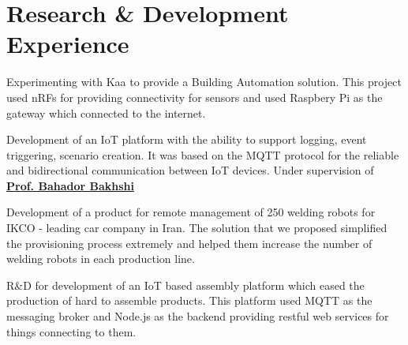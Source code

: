 \documentclass[]{deedy-resume-openfont}
\begin{document}
\begin{minipage}[t]{0.66\textwidth}


\section{Research \& Development Experience}


    \vspace{\topsep} %
    \begin{tightemize}
    \item
        Experimenting with Kaa to provide a Building Automation solution.
        This project used nRFs for providing connectivity for sensors and
        used Raspbery Pi as the gateway which connected to the internet.

    \item
        Development of an IoT platform with the ability to support logging, event
        triggering, scenario creation. It was based on the MQTT protocol
        for the reliable and bidirectional communication between IoT devices.
        Under supervision of \href{http://ceit.aut.ac.ir/~bakhshis}{\textbf{Prof. Bahador Bakhshi}}
    \end{tightemize}
\sectionsep

    \vspace{\topsep} %
    \begin{tightemize}
    \item Development of a product for remote management of 250 welding robots
        for IKCO - leading car company in Iran. The solution that we proposed
        simplified the provisioning process extremely and helped them increase
        the number of welding robots in each production line.

    \item R\&D for development of an IoT based assembly platform which eased
        the production of hard to assemble products. This platform used MQTT
        as the messaging broker and Node.js as the backend providing restful
        web services for things connecting to them.
    \end{tightemize}


\end{minipage}
\end{document}
